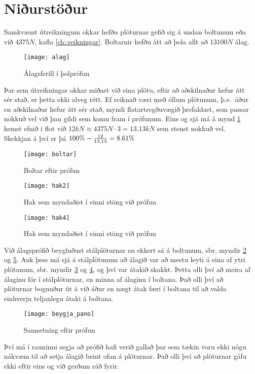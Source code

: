 
\section{Niðurstöður}
\label{sec:nidurstodur}

Samkvæmt útreikningum okkar hefðu plöturnar gefið sig á undan boltunum eða við $4375 N$, \sbr kafla \ref{ch::reikningar}.
Boltarnir hefðu átt að þola allt að $13100 N$ álag.

\begin{figure}[h]
  \centering
  \texttt{[image: alag]}
  \caption{Álagsferill í þolprófun}
  \label{fig:alag}
\end{figure}

Þar sem útreikningar okkar miðast við eina plötu, \te eftir að aðskilnaður hefur átt sér stað, er þetta ekki alveg rétt.
Ef reiknað væri með öllum plötunum, þ.e.~áður en aðskilnaður hefur átt sér stað, myndi flatartregðuvægið þrefaldast, sem passar nokkuð vel við þau gildi sem komu fram í prófunum.
Eins og sjá má á mynd \ref{fig:alag} kemst efnið í flot við \(12 kN \approx 4375 N \cdot 3 = 13.13 kN\) sem stenst nokkuð vel.
Skekkjan á því er þá \(100\% - {12 \over 13.13} = 8.61\% \)

\clearpage

\begin{figure}
  \centering
  \texttt{[image: boltar]}
  \caption{Boltar eftir prófun}
  \label{fig:boltar}
\end{figure}


\begin{figure}
  \centering
  \texttt{[image: hak2]}
  \caption{Hak sem myndaðist í einni stöng við prófun}
  \label{fig:hak2}
\end{figure}

\begin{figure}
  \centering
  \texttt{[image: hak4]}
  \caption{Hak sem myndaðist í einni stöng við prófun}
  \label{fig:hak4}
\end{figure}


Við álagsprófið beygluðust stálplöturnar en ekkert sá á boltunum, sbr. myndir \ref{fig:boltar} og \ref{fig:pano}.
Auk þess má sjá á stálplötunum að álagið var að mestu leyti á eina af ytri plötunum, sbr. myndir \ref{fig:hak2} og \ref{fig:hak4}, og því var átakið skakkt. Þetta olli því að meira af álaginu fór í stálplöturnar, en minna af álaginu í boltana.
Það olli því að plöturnar bognuður út á við áður en nægt átak færi í boltana til að valda einhverju teljanlegu átaki á boltana.

\clearpage

\begin{figure}
  \centering
  \texttt{[image: beygja\_pano]}
  \caption{Samsetning eftir prófun}
  \label{fig:pano}
\end{figure}


Því má í rauninni segja að prófið hafi verið gallað þar sem tækin voru ekki nógu nákvæm til að setja álagið beint ofan á plöturnar. Það olli því að plöturnar gáfu ekki eftir eins og við gerðum ráð fyrir.
